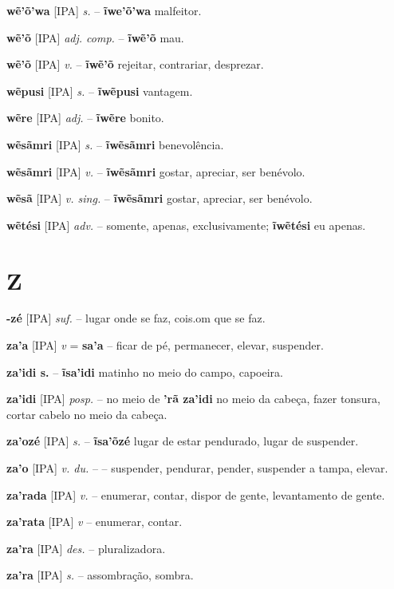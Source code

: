\textbf{wẽ'õ'wa} [IPA] \textit{s.} -- \textbf{ĩwe'õ'wa} malfeitor.

\textbf{wẽ'õ} [IPA] \textit{adj. comp.} -- \textbf{ĩwẽ'õ} mau.

\textbf{wẽ'õ} [IPA] \textit{v.} -- \textbf{ĩwẽ'õ} rejeitar, contrariar, desprezar.

\textbf{wẽpusi} [IPA] \textit{s.} -- \textbf{ĩwẽpusi} vantagem.

\textbf{wẽre} [IPA] \textit{adj.} -- \textbf{ĩwẽre} bonito.

\textbf{wẽsãmri} [IPA] \textit{s.} -- \textbf{ĩwẽsãmri} benevolência.

\textbf{wẽsãmri} [IPA] \textit{v.} -- \textbf{ĩwẽsãmri} gostar, apreciar, ser benévolo.

\textbf{wẽsã} [IPA] \textit{v. sing.} -- \textbf{ĩwẽsãmri} gostar, apreciar, ser benévolo.

\textbf{wẽtési} [IPA] \textit{adv.} -- somente, apenas, exclusivamente; \textbf{ĩwẽtési} eu apenas.


\section*{Z}



\textbf{-zé} [IPA] \textit{suf.} -- lugar onde se faz, cois.om que se faz.

\textbf{za'a} [IPA] \textit{v} = \textbf{sa'a} -- ficar de pé, permanecer, elevar, suspender.

\textbf{za'idi s.} -- \textbf{ĩsa'idi} matinho no meio do campo, capoeira.

\textbf{za'idi} [IPA] \textit{posp.} -- no meio de  \textbf{'rã za'idi} no meio da cabeça, fazer tonsura, cortar cabelo no meio da cabeça.

\textbf{za'ozé} [IPA] \textit{s.} -- \textbf{ĩsa'õzé} lugar de estar pendurado, lugar de suspender.

\textbf{za'o} [IPA] \textit{v. du.} -- -- suspender, pendurar, pender, suspender a tampa, elevar.

\textbf{za'rada} [IPA] \textit{v.} -- enumerar, contar, dispor de gente, levantamento de gente.

\textbf{za'rata} [IPA] \textit{v} -- enumerar, contar.

\textbf{za'ra} [IPA] \textit{des.} -- pluralizadora.

\textbf{za'ra} [IPA] \textit{s.} -- assombração, sombra.

